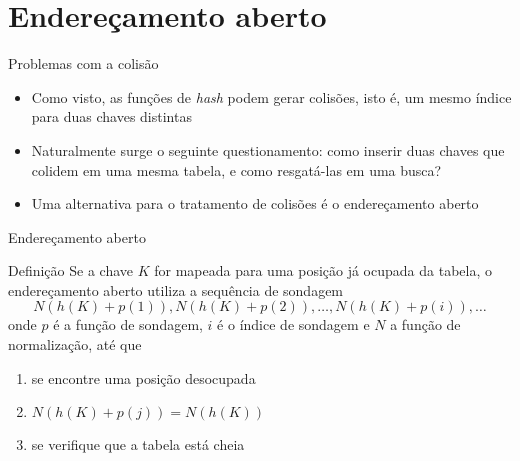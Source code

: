 \section{Endereçamento aberto}

\begin{frame}{Problemas com a colisão} 

	\begin{itemize}
		\item Como visto, as funções de \textit{hash} podem gerar colisões, isto é, 
            um mesmo índice para duas chaves distintas

		\item Naturalmente surge o seguinte questionamento: como inserir duas chaves que colidem 
            em uma mesma tabela, e como resgatá-las em uma busca?

		\item Uma alternativa para o tratamento de colisões é o endereçamento aberto
	\end{itemize}

\end{frame}

\begin{frame}{Endereçamento aberto} 

    \begin{block}{Definição}
        Se a chave $K$ for mapeada para uma posição já ocupada da tabela, o 
        endereçamento aberto utiliza a sequência de sondagem
        $$
        N(h(K) + p(1)), N(h(K) + p(2)),  \ldots, N(h(K) + p(i)), \ldots
        $$
        onde $p$ é a função de sondagem, $i$ é o índice de sondagem e $N$ a função de 
        normalização, até que 
        \begin{enumerate}
            \item se encontre uma posição desocupada
            \item $N(h(K) + p(j)) = N(h(K))$
            \item se verifique que a tabela está cheia
        \end{enumerate}
    \end{block}

\end{frame}

